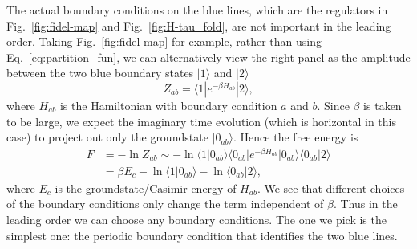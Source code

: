 The actual boundary conditions on the blue lines, which are the regulators in Fig.~\ref{fig:fidel-map} and Fig.~\ref{fig:H-tau_fold}, are not important in the leading order. Taking Fig.~\ref{fig:fidel-map} for example, rather than using Eq.~\eqref{eq:partition_fun}, we can alternatively view the right panel as the amplitude between the two blue boundary states $|1\rangle$ and $|2\rangle$
\begin{equation}
Z_{ab} =  \langle 1 | e^{ - \beta H_{ab}} | 2 \rangle  , 
\end{equation}
where $H_{ab}$ is the Hamiltonian with boundary condition $a$ and $b$. Since $\beta$ is taken to be large, we expect the imaginary time evolution (which is horizontal in this case) to project out only the groundstate $|0_{ab}\rangle $. Hence the free energy is
\begin{equation}
\begin{aligned}
F &=  - \ln Z_{ab}  \sim - \ln \langle 1 |0_{ab} \rangle \langle   0_{ab}  |e^{ - \beta H_{ab}}|0_{ab} \rangle \langle 0_{ab} | 2 \rangle \\
&= \beta  E_c - \ln \langle 1| 0_{ab} \rangle  - \ln \langle 0_{ab}  |2 \rangle,
\end{aligned}
\end{equation}
where $E_c$ is the groundstate/Casimir energy of $H_{ab}$. We see that different choices of the boundary conditions only change the term independent of $\beta$. Thus in the leading order we can choose any boundary conditions. The one we pick is the simplest one: the periodic boundary condition that identifies the two blue lines. 

